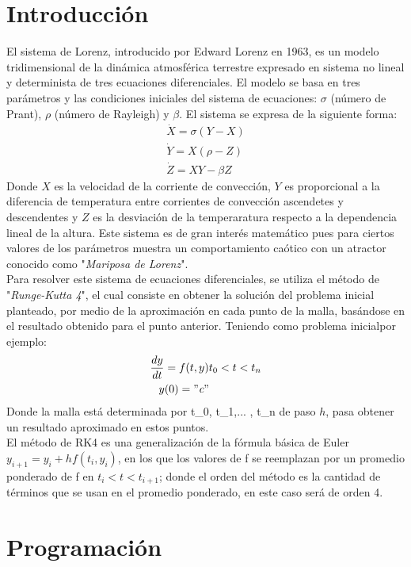 \documentclass[letterpaper, 12pt]{article}
\begin{document}
{\section*{Introducci\'on}

\justify
El sistema de Lorenz, introducido por Edward Lorenz en 1963, es un modelo tridimensional de la din\'amica atmosf\'erica terrestre expresado en sistema no lineal y determinista de tres ecuaciones diferenciales. El modelo se basa en tres par\'ametros y las condiciones iniciales del sistema de ecuaciones: $\sigma$ (número de Prant), $\rho$ (número de Rayleigh) y $\beta$.
El sistema se expresa de la siguiente forma:
\begin{align}
\dot{X} = \sigma (Y-X)\\
\dot{Y} = X(\rho - Z)\\
\dot{Z} = XY - \beta Z
\end{align}
Donde $X$ es la velocidad de la corriente de convecci\'on, $Y$ es proporcional a la diferencia de temperatura entre  corrientes de convecci\'on ascendetes y descendentes y $Z$ es la desviaci\'on de la temperaratura respecto a la dependencia lineal de la altura. Este sistema es de gran inter\'es matem\'atico pues para ciertos valores de los par\'ametros muestra un comportamiento ca\'otico con un atractor conocido como "\textit{Mariposa de Lorenz}".\\
Para resolver este sistema de ecuaciones diferenciales, se utiliza el método de "\textit{Runge-Kutta 4}", el cual consiste en obtener la soluci\'on del problema inicial planteado, por medio de la aproximaci\'on en cada punto de la malla, bas\'andose en el resultado obtenido para el punto anterior. Teniendo como problema inicialpor ejemplo:
\begin{align}
  \frac{dy}{dt} = f(t,y)  &  t_0 < t < t_n\\
  y(0) = "\textit{c}"
\end{align}
Donde la malla está determinada por {t_0, t_1,... , t_n} de paso $h$, pasa obtener un resultado aproximado en estos puntos. \\
El método de RK4 es una generalizaci\'on de la f\'ormula b\'asica de Euler $y_{i+1} = y_i + h f(t_i, y_i)$, en los que los valores de f se reemplazan por un promedio ponderado de f en $t_i < t < t_{i+1}$; donde el orden del m\'etodo es la cantidad de t\'erminos que se usan en el promedio ponderado, en este caso será de orden 4.



\section*{Programaci\'on}

}
\end{document}
